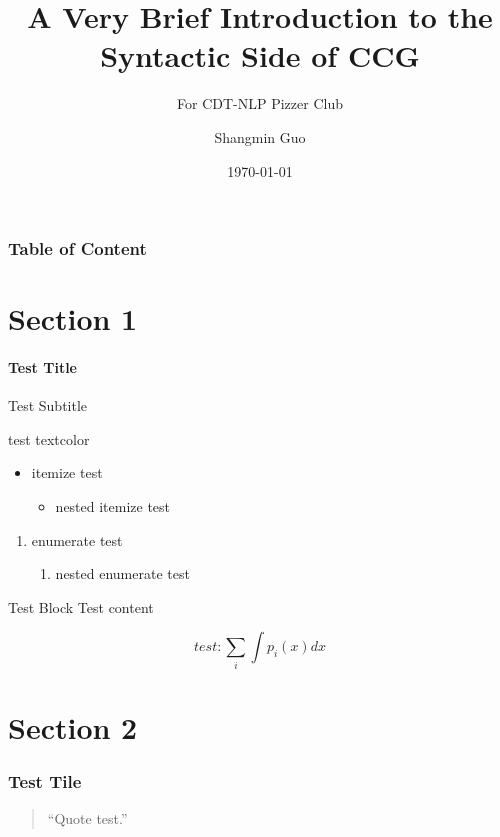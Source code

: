 \documentclass[mathserif,xcolor=dvipsnames,svgnames,aspectratio=43,compress]{beamer}
\begin{document}
\title{A Very Brief Introduction to the Syntactic Side of CCG}
\subtitle{For CDT-NLP Pizzer Club}
\author{Shangmin Guo}
\date[\today]{\today} %

\begin{frame}
    \titlepage
\end{frame}

\begin{frame}[plain, t]
    \frametitle{Table of Content}
    \tableofcontents
\end{frame}

\section{Section 1}

\begin{frame}[t]
    \framesubtitle{Test Title}{Test Subtitle}

    test textcolor

    \begin{itemize}
        \item itemize test
        \begin{itemize}
            \item nested itemize test
        \end{itemize}
    \end{itemize}

    \begin{enumerate}
        \item enumerate test
        \begin{enumerate}
            \item nested enumerate test
        \end{enumerate}
    \end{enumerate}

    \begin{block}{Test Block}
        Test content
    \end{block}

    \begin{equation}
        test: \sum_{i} \int p_i(x)dx
    \end{equation}

\end{frame}

\section{Section 2}

\begin{frame}[t]
    \frametitle{Test Tile}
    \begin{quote}
        ``Quote test.''
    \end{quote}
\end{frame}
\end{document}
